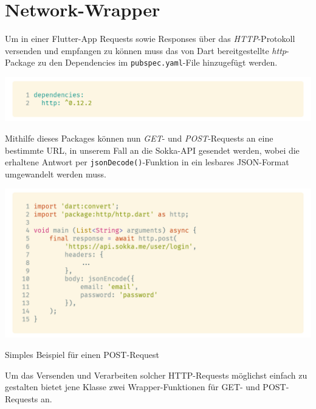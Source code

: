 \section{Network-Wrapper}
\label{clientnetwork}

Um in einer Flutter-App Requests sowie Responses über das \textit{HTTP}-Protokoll versenden und empfangen zu können
muss das von Dart bereitgestellte \textit{http}-Package zu den Dependencies im \lstinline{pubspec.yaml}-File hinzugefügt
werden.

\begin{code}
    \centering
    \includegraphics[width=1\textwidth]{images/Client/util/network-wrapper/dependency.png}
    \vspace{-25pt}
    \caption{Hinzufügen des \textbf{http}-Packages zum \lstinline{pubspec.yaml}-File}
\end{code}

Mithilfe dieses Packages können nun \textit{GET}- und \textit{POST}-Requests an eine bestimmte URL, in unserem Fall
an die Sokka-API gesendet werden, wobei die erhaltene Antwort per \lstinline{jsonDecode()}-Funktion in ein lesbares
JSON-Format umgewandelt werden muss.

\begin{code}[H]
    \centering
    \includegraphics[width=1\textwidth]{images/Client/util/network-wrapper/postRequest.png}
    \vspace{-25pt}
    \caption{Simples Beispiel für einen POST-Request}
\end{code}

Um das Versenden und Verarbeiten solcher HTTP-Requests möglichst einfach zu gestalten bietet jene
Klasse zwei Wrapper-Funktionen für GET- und POST-Requests an.

